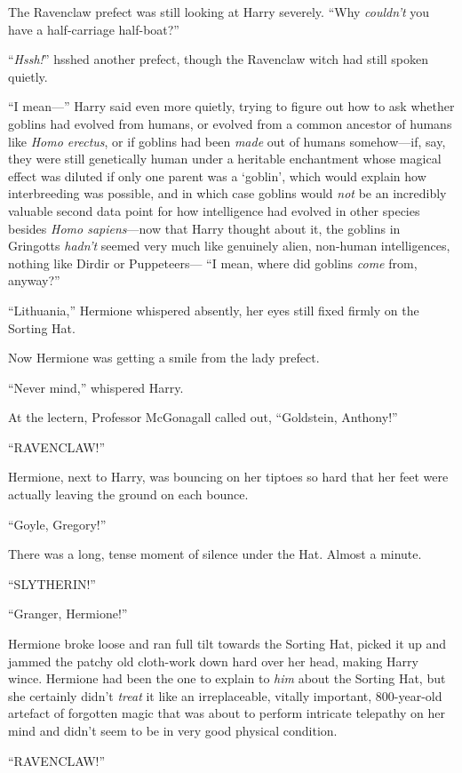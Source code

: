 The Ravenclaw prefect was still looking at Harry severely. “Why \emph{couldn’t} you have a half-carriage half-boat?”

“\emph{Hssh!}” hsshed another prefect, though the Ravenclaw witch had still spoken quietly.

“I mean—” Harry said even more quietly, trying to figure out how to ask whether goblins had evolved from humans, or evolved from a common ancestor of humans like \emph{Homo erectus}, or if goblins had been \emph{made} out of humans somehow—if, say, they were still genetically human under a heritable enchantment whose magical effect was diluted if only one parent was a ‘goblin’, which would explain how interbreeding was possible, and in which case goblins would \emph{not} be an incredibly valuable second data point for how intelligence had evolved in other species besides \emph{Homo sapiens}—now that Harry thought about it, the goblins in Gringotts \emph{hadn’t} seemed very much like genuinely alien, non-human intelligences, nothing like Dirdir or Puppeteers— “I mean, where did goblins \emph{come} from, anyway?”

“Lithuania,” Hermione whispered absently, her eyes still fixed firmly on the Sorting Hat.

Now Hermione was getting a smile from the lady prefect.

“Never mind,” whispered Harry.

At the lectern, Professor McGonagall called out, “Goldstein, Anthony!”

“RAVENCLAW!”

Hermione, next to Harry, was bouncing on her tiptoes so hard that her feet were actually leaving the ground on each bounce.

“Goyle, Gregory!”

There was a long, tense moment of silence under the Hat. Almost a minute.

“SLYTHERIN!”

“Granger, Hermione!”

Hermione broke loose and ran full tilt towards the Sorting Hat, picked it up and jammed the patchy old cloth-work down hard over her head, making Harry wince. Hermione had been the one to explain to \emph{him} about the Sorting Hat, but she certainly didn’t \emph{treat} it like an irreplaceable, vitally important, 800-year-old artefact of forgotten magic that was about to perform intricate telepathy on her mind and didn’t seem to be in very good physical condition.

“RAVENCLAW!”

